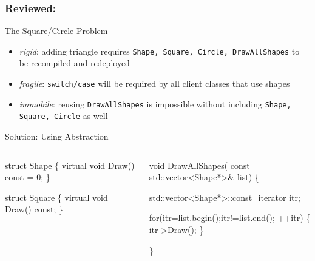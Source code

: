 \documentclass[9pt,handout]{beamer}
\begin{document}
\begin{frame}[fragile]
  \frametitle{Reviewed: \secname}
  \begin{block}{The Square/Circle Problem}
    \begin{itemize}
    \item \emph{rigid}: adding triangle requires \texttt{Shape, Square, Circle, DrawAllShapes} to be recompiled and redeployed
    \item \emph{fragile}: \texttt{switch/case} will be required by all client classes that use shapes
    \item \emph{immobile}: reusing \texttt{DrawAllShapes} is impossible without including \texttt{Shape, Square, Circle} as well
    \end{itemize}
  \end{block}
\pause
\begin{block}{Solution: Using Abstraction}
    
    \begin{columns}[t]
      \begin{column}{.45\textwidth}
        \small
        \begin{semiverbatim}
struct Shape \{ 
  virtual void Draw() const = 0; 
\}

struct Square \{ 
  virtual void Draw() const; 
\}
        \end{semiverbatim}
      \end{column}
      \begin{column}{.45\textwidth}
        \scriptsize
        \begin{semiverbatim}
void DrawAllShapes(
  const std::vector<Shape*>& list) \{

  std::vector<Shape*>::const_iterator itr; 

  for(itr=list.begin();itr!=list.end(); ++itr) 
  \{ 
    itr->Draw(); 
  \}

\}
        \end{semiverbatim}
      \end{column}

    \end{columns}

  \end{block}



\end{frame}
\end{document}
